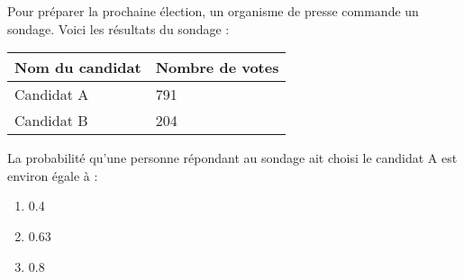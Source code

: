 Pour préparer la prochaine élection, un organisme de presse commande un sondage. Voici les résultats du sondage :
\begin{center}
    \begin{tabularx}{0.5\linewidth}{|X|X|}\hline
        Nom du candidat & Nombre de votes \\ \hline\hline
        Candidat A & 791 \\ \hline
        Candidat B & 204 \\ \hline
    \end{tabularx}
\end{center}

La probabilité qu'une personne répondant au sondage ait choisi le candidat A est environ égale à :
\begin{multicols}{4}
    \begin{enumerate}[label=\textbf{\alph*)}]
        \item{\num{0.4}}
        \item{\num{0.63}}
        \item{\num{0.8}}
    \end{enumerate}
\end{multicols}
    